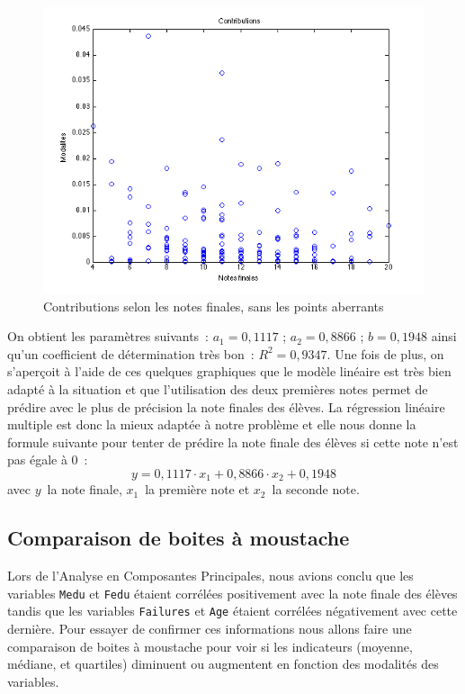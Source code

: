 \documentclass[11pt]{article}
\begin{document}
\begin{figure}[h]
\centering
\includegraphics[scale=0.55]{Images/fig24.png}
\caption{Contributions selon les notes finales, sans les points aberrants}
\end{figure}

\FloatBarrier
On obtient les paramètres suivants : $a_1=0,1117$ ; $a_2=0,8866$ ; $b=0,1948$ ainsi qu'un coefficient de détermination très bon : $R^2=0,9347$. Une fois de plus, on s’aperçoit à l'aide de ces quelques graphiques que le modèle linéaire est très bien adapté à la situation et que l'utilisation des deux premières notes permet de prédire avec le plus de précision la note finales des élèves. La régression linéaire multiple est donc la mieux adaptée à notre problème et elle nous donne la formule suivante pour tenter de prédire la note finale des élèves si cette note n'est pas égale à 0 :
$$ y = 0,1117\cdot x_1 + 0,8866\cdot x_2 + 0,1948$$ avec $y$ la note finale, $x_1$ la première note et $x_2$ la seconde note.


\subsection{Comparaison de boites à moustache}
Lors de l'Analyse en Composantes Principales, nous avions conclu que les variables \texttt{Medu} et \texttt{Fedu} étaient corrélées positivement avec la note finale des élèves tandis que les variables \texttt{Failures} et \texttt{Age} étaient corrélées négativement avec cette dernière. Pour essayer de confirmer ces informations nous allons faire une comparaison de boites à moustache pour voir si les indicateurs (moyenne, médiane, et quartiles) diminuent ou augmentent en fonction des modalités des variables.
\end{document}
